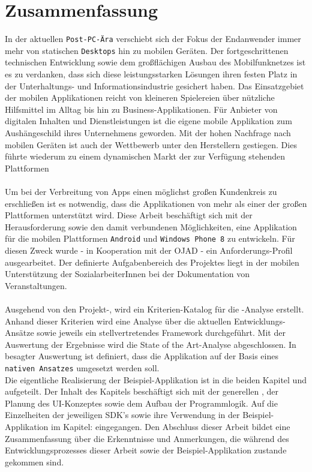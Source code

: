 \documentclass[Bachelorarbeit.tex]{subfiles}
\begin{document}
\chapter*{Zusammenfassung}

In der aktuellen \texttt{Post-PC-Ära} verschiebt sich der Fokus der Endanwender immer mehr von statischen \texttt{Desktops} hin zu mobilen Geräten. 
Der fortgeschrittenen technischen Entwicklung sowie dem großflächigen Ausbau des Mobilfunknetzes ist es zu verdanken, dass  sich diese leistungsstarken Lösungen ihren festen Platz in der Unterhaltungs- und Informationsindustrie gesichert haben.
Das Einsatzgebiet der mobilen Applikationen reicht von kleineren Spielereien über nützliche Hilfsmittel im Alltag bis hin zu Business-Applikationen.
Für Anbieter von digitalen Inhalten und Dienstleistungen ist die eigene mobile Applikation zum Aushängeschild ihres Unternehmens geworden.
Mit der hohen Nachfrage nach mobilen Geräten ist auch der Wettbewerb unter den Herstellern gestiegen. 
Dies führte wiederum zu einem dynamischen Markt der zur Verfügung stehenden Plattformen\\
\\
Um bei der Verbreitung von Apps einen möglichst großen Kundenkreis zu erschließen ist es notwendig, dass die Applikationen von mehr als einer der großen Plattformen unterstützt wird.
Diese Arbeit beschäftigt sich mit der Herausforderung sowie den damit verbundenen Möglichkeiten, eine Applikation für die mobilen Plattformen \texttt{Android} und \texttt{Windows Phone 8} zu entwickeln.
Für diesen Zweck wurde - in Kooperation mit der \ac{OJAD} - ein Anforderungs-Profil ausgearbeitet.
Der definierte Aufgabenbereich des Projektes liegt in der mobilen Unterstützung der SozialarbeiterInnen bei der Dokumentation von Veranstaltungen.\\
\\
Ausgehend von den Projekt-, wird ein Kriterien-Katalog für die -Analyse erstellt.
Anhand dieser Kriterien wird eine Analyse über die aktuellen Entwicklungs-Ansätze sowie jeweils ein stellvertretendes Framework durchgeführt. 
Mit der Auswertung der Ergebnisse wird die State of the Art-Analyse abgeschlossen.
In besagter Auswertung ist definiert, dass die Applikation auf der Basis eines \texttt{nativen Ansatzes} umgesetzt werden soll.\\
Die eigentliche Realisierung der Beispiel-Applikation ist in die beiden Kapitel \texttt{} und \texttt{} aufgeteilt.
Der Inhalt des Kapitels  beschäftigt sich mit der generellen , der Planung des \ac{UI}-Konzeptes sowie dem Aufbau der Programmlogik.
Auf die Einzelheiten der jeweiligen \ac{SDK}'s sowie ihre Verwendung in der Beispiel-Applikation im Kapitel:   eingegangen. 
Den Abschluss dieser Arbeit bildet eine Zusammenfassung über die Erkenntnisse und Anmerkungen, die während des Entwicklungsprozesses dieser Arbeit sowie der Beispiel-Applikation zustande gekommen sind.
\end{document}
